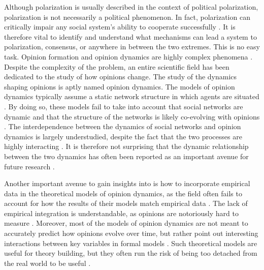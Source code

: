 \documentclass[11pt]{article}
\begin{document}
\noindent Although polarization is usually described in the context of political polarization, polarization is not necessarily a political phenomenon. In fact, polarization can critically impair any social system's ability to cooperate successfully \cite{levin_dynamics_2021}. It is therefore vital to identify and understand what mechanisms can lead a system to polarization, consensus, or anywhere in between the two extremes. This is no easy task. Opinion formation and opinion dynamics are highly complex phenomena \cite{baumann2021modeling}. 
Despite the complexity of the problem, an entire scientific field has been dedicated to the study of how opinions change. The study of the dynamics shaping opinions is aptly named opinion dynamics. The models of opinion dynamics typically assume a static network structure in which agents are situated \cite{galesic_integrating_2021}. By doing so, these models fail to take into account that social networks are dynamic and that the structure of the networks is likely co-evolving with opinions \cite{de2022modelling,galesic_integrating_2021}. The interdependence between the dynamics of social networks and opinion dynamics is largely understudied, despite the fact that the two processes are highly interacting \cite{asikainen_cumulative_2020,bruch_agent-based_2015,galesic_integrating_2021,kossinets_origins_2009,noorazar_classical_2020}. It is therefore not surprising that the dynamic relationship between the two dynamics has often been reported as an important avenue for future research \cite{flache_models_2017,galesic_integrating_2021}. 

\noindent Another important avenue to gain insights into is how to incorporate empirical data in the theoretical models of opinion dynamics, as the field often fails to account for how the results of their models match empirical data \cite{galesic_integrating_2021,flache_models_2017, mas2019challenges}. 
The lack of empirical integration is understandable, as opinions are notoriously hard to measure \cite{mas2019challenges}. Moreover, most of the models of opinion dynamics are not meant to accurately predict how opinions evolve over time, but rather point out interesting interactions between key variables in formal models \cite{mas2019challenges}. Such theoretical models are useful for theory building, but they often run the risk of being too detached from the real world to be useful \cite{smaldino_how_2020, mas2019challenges}.  
\end{document}
